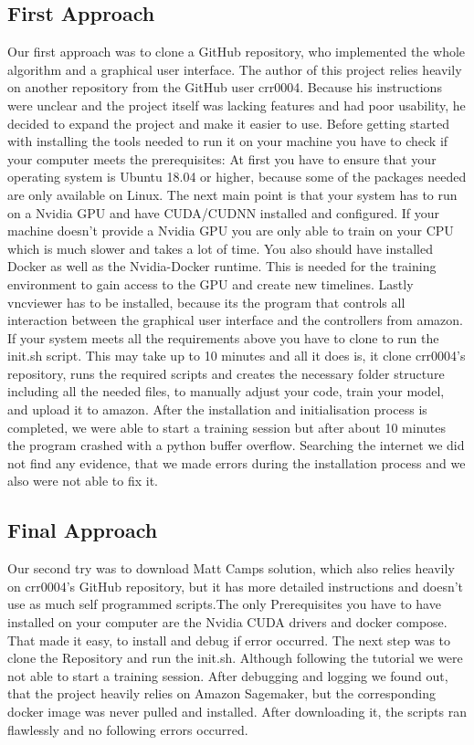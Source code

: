 \subsection{First Approach}
Our first approach was to clone a GitHub repository, who implemented the whole algorithm and a graphical user interface. The author of this project relies heavily on another repository from the GitHub user crr0004. Because his instructions were unclear and the project itself was lacking features and had poor usability, he decided to expand the project and make it easier to use. 
Before getting started with installing the tools needed to run it on your machine you have to check if your computer meets the prerequisites:
At first you have to ensure that your operating system is Ubuntu 18.04 or higher, because some of the packages needed are only available on Linux.
The next main point is that your system has to run on a Nvidia GPU and have CUDA/CUDNN installed and configured. If your machine doesn't provide a Nvidia GPU you are only able to train on your CPU which is much slower and takes a lot of time.
You also should have installed Docker as well as the Nvidia-Docker runtime. This is needed for the training environment to gain access to the GPU and create new timelines.
Lastly vncviewer has to be installed, because its the program that controls all interaction between the graphical user interface and the controllers from amazon.
If your system meets all the requirements above you have to clone to run the init.sh script.
This may take up to 10 minutes and all it does is, it clone crr0004's repository, runs the required scripts and creates the necessary folder structure including all the needed files, to manually adjust your code, train your model, and upload it to amazon.
After the installation and initialisation process is completed, we were able to start a training session but after about 10 minutes the program crashed with a python buffer overflow. Searching the internet we did not find any evidence, that we made errors during the installation process and we also were not able to fix it.

\subsection{Final Approach}
Our second try was to download Matt Camps solution, which also relies heavily on crr0004's GitHub repository, but it has more detailed instructions and doesn't use as much self programmed scripts.The only Prerequisites you have to have installed on your computer are the Nvidia CUDA drivers and docker compose. That made it easy, to install and debug if error occurred. The next step was to clone the Repository and run the init.sh. Although following the tutorial we were not able to start a training session. After debugging and logging we found out, that the project heavily relies on Amazon Sagemaker, but the corresponding docker image was never pulled and installed. After downloading it, the scripts ran flawlessly and no following errors occurred.

